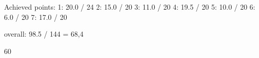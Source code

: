 Achieved points:
1: 20.0 / 24
2: 15.0 / 20
3: 11.0 / 20
4: 19.5 / 20
5: 10.0 / 20
6:  6.0 / 20
7: 17.0 / 20

overall: 98.5 / 144 = 68,4%

60%
